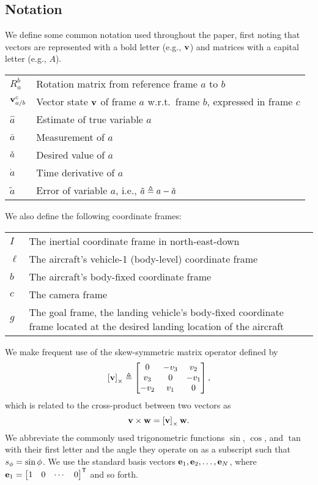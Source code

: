 
\subsection{Notation}

We define some common notation used throughout the paper, first noting that
vectors are represented with a bold letter (e.g., $\bf v$) and matrices with a
capital letter (e.g., $A$).
\begin{center}
\begin{tabularx}{\columnwidth}{lX}
$R_a^b$ & Rotation matrix from reference frame $a$ to $b$ \\
$\boldsymbol{\mathrm{v}}_{a/b}^c$ & Vector state $\boldsymbol{\mathrm{v}}$ of frame $a$ w.r.t.~frame $b$, expressed in frame $c$ \\
$\hat{a}$ & Estimate of true variable $a$ \\
$\bar{a}$ & Measurement of $a$ \\
$\check{a}$ & Desired value of $a$ \\
$\dot{a}$ & Time derivative of $a$ \\
$\tilde{a}$ & Error of variable $a$, i.e., $\tilde{a} \triangleq a - \check{a}$
\end{tabularx}
\end{center}
%
We also define the following coordinate frames:
\begin{center}
\begin{tabularx}{\columnwidth}{lX}
$I$ & The inertial coordinate frame in north-east-down\\
$\ell$ & The aircraft's vehicle-1 (body-level) coordinate frame \\
$b$ & The aircraft's body-fixed coordinate frame \\
$c$ & The camera frame \\
$g$ & The goal frame, the landing vehicle's body-fixed coordinate frame located at the desired landing location of the aircraft
\end{tabularx}
\end{center}

We make frequent use of the skew-symmetric matrix operator defined by
\begin{equation}
  \left[ \boldsymbol{\mathrm{v}} \right]_{\times} \triangleq
  \begin{bmatrix}
  0 & -v_{3} & v_{2}\\
  v_{3} & 0 & -v_{1}\\
  -v_{2} & v_{1} & 0
  \end{bmatrix},
\end{equation}
which is related to the cross-product between two vectors as
\begin{equation}
  \boldsymbol{\mathrm{v}}\times\boldsymbol{\mathrm{w}}=\left[ \boldsymbol{\mathrm{v}} \right]_{\times}\boldsymbol{\mathrm{w}}.
\end{equation}
We abbreviate the commonly used trigonometric functions $\sin$, $\cos$, and
$\tan$ with their first letter and the angle they operate on as a subscript
such that $s_\phi = \sin\phi$.
We use the standard basis vectors $\boldsymbol{\mathrm{e}}_1, \boldsymbol{\mathrm{e}}_2, \ldots, \boldsymbol{\mathrm{e}}_N$,
where $\boldsymbol{\mathrm{e}}_1 = \begin{bmatrix} 1 & 0 & \cdots & 0 \end{bmatrix}^{\mathsf{T}}$
and so forth.
